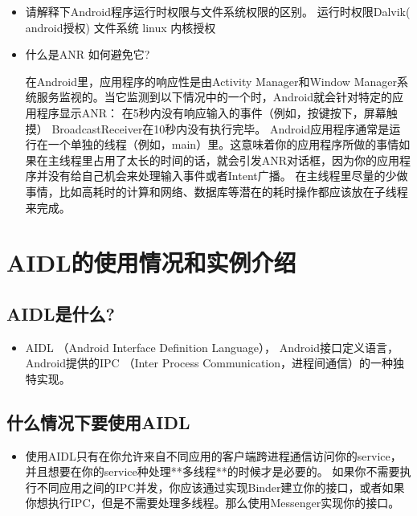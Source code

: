 \documentclass[9pt, b5paper]{article}
\begin{document}
\begin{itemize}
\item 请解释下Android程序运行时权限与文件系统权限的区别。
运行时权限Dalvik( android授权)
文件系统 linux 内核授权
\item 什么是ANR 如何避免它?

在Android里，应用程序的响应性是由Activity Manager和Window Manager系统服务监视的。当它监测到以下情况中的一个时，Android就会针对特定的应用程序显示ANR：
在5秒内没有响应输入的事件（例如，按键按下，屏幕触摸）
BroadcastReceiver在10秒内没有执行完毕。
Android应用程序通常是运行在一个单独的线程（例如，main）里。这意味着你的应用程序所做的事情如果在主线程里占用了太长的时间的话，就会引发ANR对话框，因为你的应用程序并没有给自己机会来处理输入事件或者Intent广播。
在主线程里尽量的少做事情，比如高耗时的计算和网络、数据库等潜在的耗时操作都应该放在子线程来完成。
\end{itemize}


\section{AIDL的使用情况和实例介绍}
\label{sec-17}
\subsection{AIDL是什么?}
\label{sec-17-1}
\begin{itemize}
\item AIDL （Android Interface Definition Language）， Android接口定义语言，Android提供的IPC （Inter Process Communication，进程间通信）的一种独特实现。
\end{itemize}
\subsection{什么情况下要使用AIDL}
\label{sec-17-2}
\begin{itemize}
\item 使用AIDL只有在你允许来自不同应用的客户端跨进程通信访问你的service，并且想要在你的service种处理**多线程**的时候才是必要的。 如果你不需要执行不同应用之间的IPC并发，你应该通过实现Binder建立你的接口，或者如果你想执行IPC，但是不需要处理多线程。那么使用Messenger实现你的接口。
\end{itemize}
\end{document}

